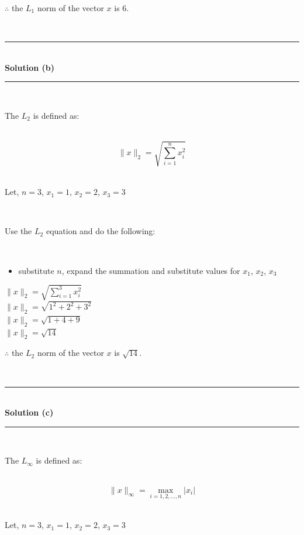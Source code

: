 \documentclass{article}
\begin{document}
\parbox{\textwidth}{$\therefore$ the $L_1$ norm of the vector $x$ is $6$.}\\

\noindent\rule{\textwidth}{0.4pt}\\

\textbf{Solution (b)}

\noindent\rule{\textwidth}{0.4pt}\\

\parbox{\textwidth}{The $L_2$ is defined as:}\\

$$\|x\|_2 = \sqrt{\sum_{i=1}^{n} x_i^2}$$\\

\parbox{\textwidth}{Let, $n=3$, $x_1 = 1$, $x_2 = 2$, $x_3 = 3$}\\

\parbox{\textwidth}{Use the $L_2$ equation and do the following:}\\

\newpage

\begin{itemize}
    \item {substitute $n$, expand the summation and substitute values for $x_1$, $x_2$, $x_3$}
\end{itemize}

$\|x\|_2 = \sqrt{\sum_{i=1}^{3} x_i^2}$\\

$\|x\|_2 = \sqrt{1^2 + 2^2 + 3^2}$\\

$\|x\|_2 = \sqrt{1 + 4 + 9}$\\

$\|x\|_2 = \sqrt{14}$\\

\parbox{\textwidth}{$\therefore$ the $L_2$ norm of the vector $x$ is $\sqrt{14}$.}\\

\noindent\rule{\textwidth}{0.4pt}\\

\textbf{Solution (c)}

\noindent\rule{\textwidth}{0.4pt}\\

\parbox{\textwidth}{The $L_{\infty}$ is defined as:}\\

$$\|x\|_{\infty} = \max_{i=1,2,...,n} |x_i|$$\\

\parbox{\textwidth}{Let, $n=3$, $x_1 = 1$, $x_2 = 2$, $x_3 = 3$}\\
\end{document}
